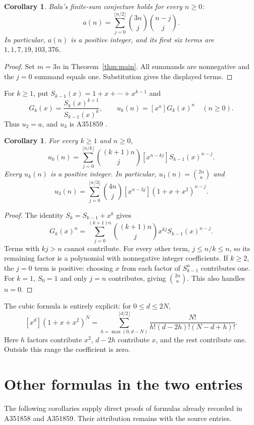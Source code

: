 \documentclass[11pt]{article}
\newtheorem{corollary}[theorem]{Corollary}
\begin{document}
\begin{corollary}\label{cor:bala}
Bala's finite-sum conjecture holds for every $n\geq0$:
\[
 a(n)=\sum_{j=0}^{\lfloor n/2\rfloor}\binom{3n}{j}\binom{n-j}{j}.
\]
In particular, $a(n)$ is a positive integer, and its first six terms are
$1,1,7,19,103,376$.
\end{corollary}
\begin{proof}
Set $m=3n$ in Theorem~\ref{thm:main}. All summands are nonnegative and the
$j=0$ summand equals one. Substitution gives the displayed terms.
\end{proof}

For $k\geq1$, put $S_{k-1}(x)=1+x+\cdots+x^{k-1}$ and
\[
 G_k(x)=\frac{S_k(x)^{k+1}}{S_{k-1}(x)^k},\qquad
 u_k(n)=[x^n]G_k(x)^n\quad(n\geq0).
\]
Thus $u_2=a$, and $u_3$ is A351859 \cite{bala3}.

\begin{corollary}\label{cor:family}
For every $k\geq1$ and $n\geq0$,
\begin{equation}\label{eq:family}
 u_k(n)=\sum_{j=0}^{\lfloor n/k\rfloor}\binom{(k+1)n}{j}
 [x^{n-kj}]S_{k-1}(x)^{n-j}.
\end{equation}
Every $u_k(n)$ is a positive integer. In particular,
$u_1(n)=\binom{2n}{n}$ and
\[
 u_3(n)=\sum_{j=0}^{\lfloor n/3\rfloor}\binom{4n}{j}
 [x^{n-3j}](1+x+x^2)^{n-j}.
\]
\end{corollary}
\begin{proof}
The identity $S_k=S_{k-1}+x^k$ gives
\[
 G_k(x)^n=\sum_{j=0}^{(k+1)n}\binom{(k+1)n}{j}
 x^{kj}S_{k-1}(x)^{n-j}.
\]
Terms with $kj>n$ cannot contribute. For every other term,
$j\leq n/k\leq n$, so its remaining factor is a polynomial with
nonnegative integer coefficients. If $k\geq2$, the $j=0$ term is positive:
choosing $x$ from each factor of $S_{k-1}^n$ contributes one. For $k=1$,
$S_0=1$ and only $j=n$ contributes, giving $\binom{2n}{n}$. This also
handles $n=0$.
\end{proof}

The cubic formula is entirely explicit: for $0\leq d\leq2N$,
\[
 [x^d](1+x+x^2)^N
 =\sum_{h=\max(0,d-N)}^{\lfloor d/2\rfloor}
 \frac{N!}{h!(d-2h)!(N-d+h)!}.
\]
Here $h$ factors contribute $x^2$, $d-2h$ contribute $x$, and the rest
contribute one. Outside this range the coefficient is zero.

\section{Other formulas in the two entries}\label{sec:siblings}
The following corollaries supply direct proofs of formulas already recorded
in A351858 and A351859. Their attribution remains with the source entries.
\end{document}
